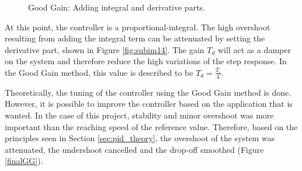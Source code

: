 \begin{figure}[H]
\hfill
{}
\hfill
{}
\hfill

\caption{Good Gain: Adding integral and derivative parts.}
\end{figure}

At this point, the controller is a proportional-integral. The high overshoot resulting from adding the integral term can be attenuated by setting the derivative part, shown in Figure \ref{fig:subim14}. The gain $T_d$ will act as a damper on the system and therefore reduce the high variations of the step response. In the Good Gain method, this value is described to be $T_d = \frac{T_i}{4}$.

\vspace{5mm}

Theoretically, the tuning of the controller using the Good Gain method is done. However, it is possible to improve the controller based on the application that is wanted. In the case of this project, stability and minor overshoot was more important than the reaching speed of the reference value. Therefore, based on the principles seen in Section \ref{sec:pid_theory}, the overshoot of the system was attenuated, the undershoot cancelled and the drop-off smoothed (Figure \ref{finalGG}).

